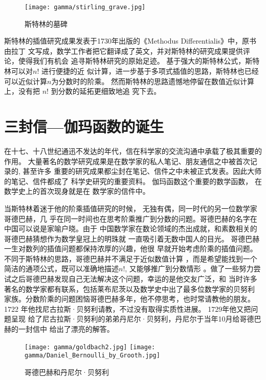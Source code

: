 {\begin{figure}[htbp]
\centering
\texttt{[image: gamma/stirling\_grave.jpg]}
\caption{斯特林的墓碑}
\end{figure}

斯特林的插值研究成果发表于1730年出版的《Methodus Differentialis》中，原书由拉丁
文写成，数学工作者把它翻译成了英文，并对斯特林的研究成果提供评论，使得我们有机会
追寻斯特林研究的原始足迹。 基于强大的斯特林公式，斯特林可以对$n!$ 进行便捷的近
似计算，进一步基于多项式插值的思路，斯特林也已经可以近似计算$n$为分数时的阶乘。
然而斯特林的思路遗憾地停留在数值近似计算上，没有把 $n!$ 到分数的延拓更细致地追
究下去。


\section{三封信---伽玛函数的诞生}

在十七、十八世纪通迅不发达的年代，信在科学家的交流沟通中承载了极其重要的作用。
大量著名的数学研究成果是在数学家的私人笔记、朋友通信之中被首次记录的, 甚至许多
重要的研究成果都尘封在笔记、信件之中未被正式发表。因此大师的笔记、信件都成了
科学史研究的重要资料。 伽玛函数这个重要的数学函数， 在数学史上的首次现身就是在
数学家的信件中。

当斯特林着迷于他的阶乘插值研究的时候， 无独有偶，同一时代的另一位数学家哥德巴赫，几
乎在同一时间也在思考阶乘推广到分数的问题。哥德巴赫的名字在中国可以说是家喻户晓。由于
中国数学家在数论领域的杰出成就，和素数相关的哥德巴赫猜想作为数学皇冠上的明珠就
一直吸引着无数中国人的目光。 哥德巴赫一生对数列的插值问题都保持浓厚的兴趣，他很
早就开始考虑阶乘的插值问题。不同于斯特林的思路，哥德巴赫并不满足于近似数值计算
，而是希望能找到一个简洁的通项公式，既可以准确地描述$n!$, 又能够推广到分数情形
。做了一些努力尝试之后哥德巴赫发现自己无法解决这个问题，幸运的是他交友广泛，和
当时许多著名的数学家都有联系，包括莱布尼茨以及数学史中出了最多位数学家的贝努利
家族。分数阶乘的问题困恼哥德巴赫多年，他不停思考，也时常请教他的朋友。
1722 年他找尼古拉斯·贝努利请教，不过没有取得实质性进展。 1729年他又把问题呈现
给了尼古拉斯·贝努利的弟弟丹尼尔·贝努利，丹尼尔于当年10月给哥德巴赫的一封信中
给出了漂亮的解答。

\begin{figure}[htbp]
\centering
\texttt{[image: gamma/goldbach2.jpg]}
\quad\quad
\texttt{[image: gamma/Daniel\_Bernoulli\_by\_Grooth.jpg]}
\caption{哥德巴赫和丹尼尔·贝努利}
\end{figure}


}
